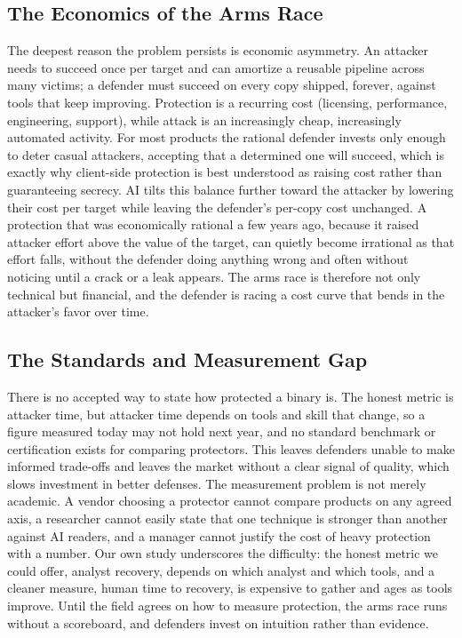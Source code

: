 \documentclass[conference]{IEEEtran}
\begin{document}
\subsection{The Economics of the Arms Race}
The deepest reason the problem persists is economic asymmetry. An attacker needs to
succeed once per target and can amortize a reusable pipeline across many victims; a
defender must succeed on every copy shipped, forever, against tools that keep
improving. Protection is a recurring cost (licensing, performance, engineering,
support), while attack is an increasingly cheap, increasingly automated activity.
For most products the rational defender invests only enough to deter casual
attackers, accepting that a determined one will succeed, which is exactly why
client-side protection is best understood as raising cost rather than guaranteeing
secrecy. AI tilts this balance further toward the attacker by lowering their cost
per target while leaving the defender's per-copy cost unchanged. A protection that
was economically rational a few years ago, because it raised attacker effort above
the value of the target, can quietly become irrational as that effort falls, without
the defender doing anything wrong and often without noticing until a crack or a leak
appears. The arms race is therefore not only technical but financial, and the
defender is racing a cost curve that bends in the attacker's favor over time.

\subsection{The Standards and Measurement Gap}
There is no accepted way to state how protected a binary is. The honest metric is
attacker time, but attacker time depends on tools and skill that change, so a figure
measured today may not hold next year, and no standard benchmark or certification
exists for comparing protectors. This leaves defenders unable to make informed
trade-offs and leaves the market without a clear signal of quality, which slows
investment in better defenses. The measurement problem is not merely academic. A
vendor choosing a protector cannot compare products on any agreed axis, a
researcher cannot easily state that one technique is stronger than another against
AI readers, and a manager cannot justify the cost of heavy protection with a number.
Our own study underscores the difficulty: the honest metric we could offer, analyst
recovery, depends on which analyst and which tools, and a cleaner measure, human
time to recovery, is expensive to gather and ages as tools improve. Until the field
agrees on how to measure protection, the arms race runs without a scoreboard, and
defenders invest on intuition rather than evidence.
\end{document}
